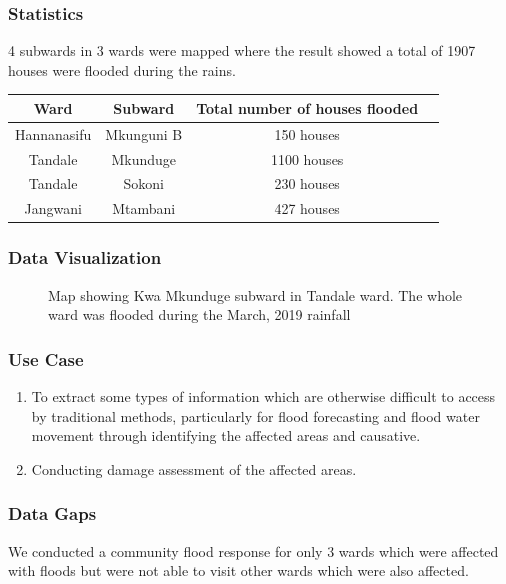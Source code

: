 \documentclass[a4paper,12pt,twoside]{article}
\begin{document}
\subsubsection{Statistics}
4 subwards in 3 wards were mapped where the result showed a total of 1907 houses were flooded during the rains.
\begin{center}
\begin{tabular}{|c|c|c|c|}
\hline
Ward & Subward & Total number of houses flooded \\
\hline
Hannanasifu & Mkunguni B & 150 houses \\
\hline
Tandale & Mkunduge & 1100 houses \\
\hline
Tandale & Sokoni & 230 houses \\
\hline
Jangwani & Mtambani & 427 houses \\
\hline
\end{tabular}
\end{center}

\subsubsection{Data Visualization}
\begin{figure}[h]
  \color{RHgreen}\caption{Map showing Kwa Mkunduge subward in Tandale ward. The whole ward was flooded during the March, 2019 rainfall}
  \centering
\end{figure}

\subsubsection{Use Case}
\begin{enumerate}
    \item To extract some types of information which are otherwise difficult to access by traditional methods, particularly for flood forecasting and flood water movement through identifying the affected areas and causative.
    \item Conducting damage assessment of the affected areas.
\end{enumerate}

\subsubsection{Data Gaps}
We conducted a community flood response for only 3 wards which were affected with floods but were not able to visit other wards which were also affected.
\end{document}
